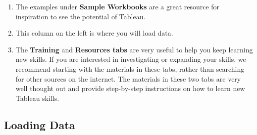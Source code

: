 \documentclass[
]{book}
\providecommand{\tightlist}{%
  \setlength{\itemsep}{0pt}\setlength{\parskip}{0pt}}
\begin{document}
\begin{enumerate}
\def\labelenumi{(\alph{enumi})}
\tightlist
\item
  The examples under \textbf{Sample Workbooks} are a great resource for inspiration to see the potential of Tableau.
\item
  This column on the left is where you will load data.
\item
  The \textbf{Training} and \textbf{Resources tabs} are very useful to help you keep learning new skills. If you are interested in investigating or expanding your skills, we recommend starting with the materials in these tabs, rather than searching for other sources on the internet. The materials in these two tabs are very well thought out and provide step-by-step instructions on how to learn new Tableau skills.
\end{enumerate}

\hypertarget{loading-data}{%
\subsection{Loading Data}\label{loading-data}}
\end{document}
